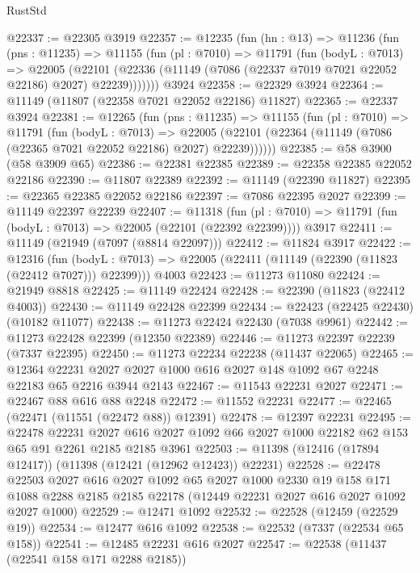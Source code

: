 \begin{lexlean}{RustStd}
\begin{coremodule}
@22337 := @22305 @3919
@22357 := @12235
    (fun (hn : @13) =>
    @11236
      (fun (pns : @11235) =>
      @11155
        (fun (pl : @7010) =>
        @11791
          (fun (bodyL : @7013) =>
          @22005
            (@22101 (@22336 (@11149 (@7086 (@22337 @7019 @7021 @22052 @22186) @2027) @22239)))))))
    @3924
@22358 := @22329 @3924
@22364 := @11149 (@11807 (@22358 @7021 @22052 @22186) @11827)
@22365 := @22337 @3924
@22381 := @12265
    (fun (pns : @11235) =>
    @11155
      (fun (pl : @7010) =>
      @11791
        (fun (bodyL : @7013) =>
        @22005 (@22101 (@22364 (@11149 (@7086 (@22365 @7021 @22052 @22186) @2027) @22239))))))
@22385 := @58 @3900 (@58 @3909 @65)
@22386 := @22381 @22385
@22389 := @22358 @22385 @22052 @22186
@22390 := @11807 @22389
@22392 := @11149 (@22390 @11827)
@22395 := @22365 @22385 @22052 @22186
@22397 := @7086 @22395 @2027
@22399 := @11149 @22397 @22239
@22407 := @11318
    (fun (pl : @7010) => @11791 (fun (bodyL : @7013) => @22005 (@22101 (@22392 @22399))))
    @3917
@22411 := @11149 (@21949 (@7097 (@8814 @22097)))
@22412 := @11824 @3917
@22422 := @12316
    (fun (bodyL : @7013) => @22005 (@22411 (@11149 (@22390 (@11823 (@22412 @7027))) @22399)))
    @4003
@22423 := @11273 @11080
@22424 := @21949 @8818
@22425 := @11149 @22424
@22428 := @22390 (@11823 (@22412 @4003))
@22430 := @11149 @22428 @22399
@22434 := @22423 (@22425 @22430) (@10182 @11077)
@22438 := @11273 @22424 @22430 (@7038 @9961)
@22442 := @11273 @22428 @22399 (@12350 @22389)
@22446 := @11273 @22397 @22239 (@7337 @22395)
@22450 := @11273 @22234 @22238 (@11437 @22065)
@22465 := @12364
    @22231
    @2027
    @2027
    @1000
    @616
    @2027
    @148
    @1092
    @67
    @2248
    @22183
    @65
    @2216
    @3944
    @2143
@22467 := @11543 @22231 @2027
@22471 := @22467 @88 @616 @88 @2248
@22472 := @11552 @22231
@22477 := @22465 (@22471 (@11551 (@22472 @88)) @12391)
@22478 := @12397 @22231
@22495 := @22478
    @22231
    @2027
    @616
    @2027
    @1092
    @66
    @2027
    @1000
    @22182
    @62
    @153
    @65
    @91
    @2261
    @2185
    @2185
    @3961
@22503 := @11398 (@12416 (@17894 @12417)) (@11398 (@12421 (@12962 @12423)) @22231)
@22528 := @22478
    @22503
    @2027
    @616
    @2027
    @1092
    @65
    @2027
    @1000
    @2330
    @19
    @158
    @171
    @1088
    @2288
    @2185
    @2185
    @22178
    (@12449 @22231 @2027 @616 @2027 @1092 @2027 @1000)
@22529 := @12471 @1092
@22532 := @22528 (@12459 (@22529 @19))
@22534 := @12477 @616 @1092
@22538 := @22532 (@7337 (@22534 @65 @158))
@22541 := @12485 @22231 @616 @2027
@22547 := @22538 (@11437 (@22541 @158 @171 @2288 @2185))

\end{coremodule}
\end{lexlean}
